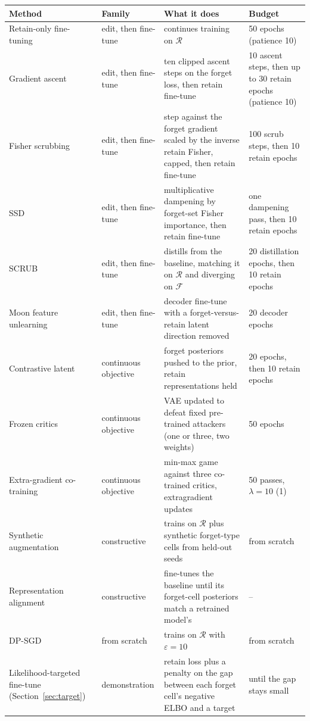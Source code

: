 \begin{tabular}{llll}
\toprule
Method & Family & What it does & Budget \\
\midrule
Retain-only fine-tuning & edit, then fine-tune & continues training on $\mathcal{R}$ & 50 epochs (patience 10) \\
Gradient ascent & edit, then fine-tune & ten clipped ascent steps on the forget loss, then retain fine-tune & 10 ascent steps, then up to 30 retain epochs (patience 10) \\
Fisher scrubbing & edit, then fine-tune & step against the forget gradient scaled by the inverse retain Fisher, capped, then retain fine-tune & 100 scrub steps, then 10 retain epochs \\
SSD & edit, then fine-tune & multiplicative dampening by forget-set Fisher importance, then retain fine-tune & one dampening pass, then 10 retain epochs \\
SCRUB & edit, then fine-tune & distills from the baseline, matching it on $\mathcal{R}$ and diverging on $\mathcal{F}$ & 20 distillation epochs, then 10 retain epochs \\
Moon feature unlearning & edit, then fine-tune & decoder fine-tune with a forget-versus-retain latent direction removed & 20 decoder epochs \\
Contrastive latent & continuous objective & forget posteriors pushed to the prior, retain representations held & 20 epochs, then 10 retain epochs \\
Frozen critics & continuous objective & VAE updated to defeat fixed pre-trained attackers (one or three, two weights) & 50 epochs \\
Extra-gradient co-training & continuous objective & min-max game against three co-trained critics, extragradient updates & 50 passes, $\lambda = 10$ (1) \\
Synthetic augmentation & constructive & trains on $\mathcal{R}$ plus synthetic forget-type cells from held-out seeds & from scratch \\
Representation alignment & constructive & fine-tunes the baseline until its forget-cell posteriors match a retrained model's & -- \\
DP-SGD & from scratch & trains on $\mathcal{R}$ with $\varepsilon = 10$ & from scratch \\
Likelihood-targeted fine-tune (Section~\ref{sec:target}) & demonstration & retain loss plus a penalty on the gap between each forget cell's negative ELBO and a target & until the gap stays small \\
\bottomrule
\end{tabular}

